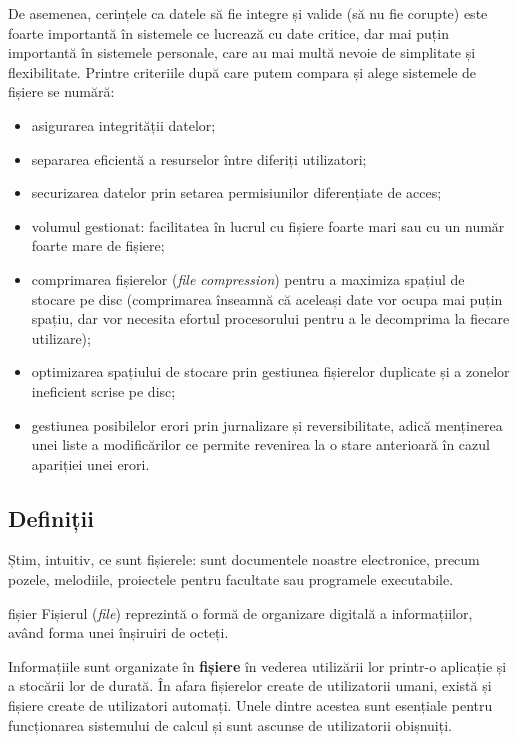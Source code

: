 De asemenea, cerințele ca datele să fie integre și valide (să nu fie corupte) este foarte importantă în sistemele ce lucrează cu date critice, dar mai puțin importantă în sistemele personale, care au mai multă nevoie de simplitate și flexibilitate.
Printre criteriile după care putem compara și alege sistemele de fișiere se numără:

\begin{itemize}
  \item asigurarea integrității datelor;
  \item separarea eficientă a resurselor între diferiți utilizatori;
  \item securizarea datelor prin setarea permisiunilor diferențiate de acces;
  \item volumul gestionat: facilitatea în lucrul cu fișiere foarte mari sau cu un număr foarte mare de fișiere;
  \item comprimarea fișierelor (\textit{file compression}) pentru a maximiza spațiul de stocare pe disc (comprimarea înseamnă că aceleași date vor ocupa mai puțin spațiu, dar vor necesita efortul procesorului pentru a le decomprima la fiecare utilizare);
  \item optimizarea spațiului de stocare prin gestiunea fișierelor duplicate și a zonelor ineficient scrise pe disc;
  \item gestiunea posibilelor erori prin jurnalizare și reversibilitate, adică menținerea unei liste a modificărilor ce permite revenirea la o stare anterioară în cazul apariției unei erori.
\end{itemize}

\subsection{Definiții}
\label{sec:fs:defs}

Știm, intuitiv, ce sunt fișierele: sunt documentele noastre electronice, precum pozele, melodiile, proiectele pentru facultate sau programele executabile.

\begin{definition}{fișier}
Fișierul (\textit{file}) reprezintă o formă de organizare digitală a informațiilor, având forma unei înșiruiri de octeți.
\end{definition}

Informațiile sunt organizate în \textbf{fișiere} în vederea utilizării lor printr-o aplicație și a stocării lor de durată.
În afara fișierelor create de utilizatorii umani, există și fișiere create de utilizatori automați.
Unele dintre acestea sunt esențiale pentru funcționarea sistemului de calcul și sunt ascunse de utilizatorii obișnuiți.

